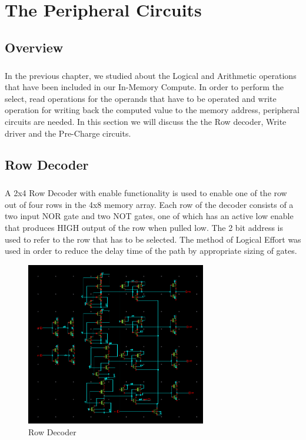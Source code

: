 %
%
\let\textcircled=\pgftextcircled
\chapter{The Peripheral Circuits}
\label{chap:peripherals}

\section{Overview}
\paragraph{}

In the previous chapter, we studied about the Logical and Arithmetic operations that have been included in our In-Memory Compute. In order to perform the select, read operations for the operands that have to be operated and write operation for writing back the computed value to the memory address, peripheral circuits are needed. In this section we will discuss the the Row decoder, Write driver and the Pre-Charge circuits. 

\section{Row Decoder}
\paragraph{}
A 2x4 Row Decoder with enable functionality is used to enable one of the row out of four rows in the 4x8 memory array. Each row of  the decoder consists of a two input NOR gate and two NOT gates, one of which has an active low enable that produces HIGH output of the row when pulled low. The 2 bit address is used to refer to the row that has to be selected. The method of Logical Effort was used in order to reduce the delay time of the path by appropriate sizing of gates.


\begin{figure}[H]
\centering
\includegraphics[width=0.7\textwidth]{row_decoder.png}
\caption{Row Decoder}
\label{fig:Figure}
\end{figure}

